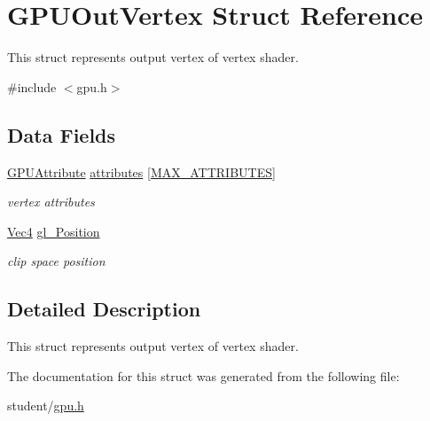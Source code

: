 \hypertarget{structGPUOutVertex}{}\section{G\+P\+U\+Out\+Vertex Struct Reference}
\label{structGPUOutVertex}


This struct represents output vertex of vertex shader.  




{\ttfamily \#include $<$gpu.\+h$>$}

\subsection*{Data Fields}
\begin{DoxyCompactItemize}
\item 
\mbox{\label{structGPUOutVertex_afbb940260f6463aa256830711c209744}} 
\hyperlink{structGPUAttribute}{G\+P\+U\+Attribute} \hyperlink{structGPUOutVertex_afbb940260f6463aa256830711c209744}{attributes} \mbox{[}\hyperlink{student_2fwd_8h_a4d992a1f9192388588184753115f6c03}{M\+A\+X\+\_\+\+A\+T\+T\+R\+I\+B\+U\+T\+ES}\mbox{]}
\begin{DoxyCompactList}\small\item\em vertex attributes \end{DoxyCompactList}\item 
\mbox{\label{structGPUOutVertex_a9bfe0011c08f039dbe6cbaafdc43d444}} 
\hyperlink{structVec4}{Vec4} \hyperlink{structGPUOutVertex_a9bfe0011c08f039dbe6cbaafdc43d444}{gl\+\_\+\+Position}
\begin{DoxyCompactList}\small\item\em clip space position \end{DoxyCompactList}\end{DoxyCompactItemize}


\subsection{Detailed Description}
This struct represents output vertex of vertex shader. 

The documentation for this struct was generated from the following file\+:\begin{DoxyCompactItemize}
\item 
student/\hyperlink{gpu_8h}{gpu.\+h}\end{DoxyCompactItemize}
